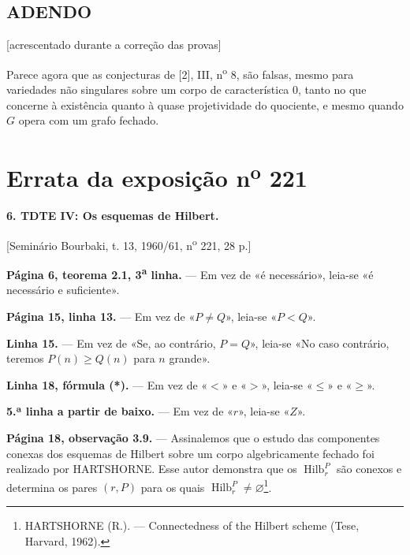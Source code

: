 \documentclass[11pt,twoside,openany]{book}
\numberwithin{equation}{section}
\newcommand{\src}[1]{%
  \phantomsection\hypertarget{src:#1}{}%
  \marginpar{\raggedleft\footnotesize\sffamily #1}%
}
\newcommand{\sid}[1]{\phantomsection\hypertarget{fga:#1}{}}
\theoremstyle{plain}
\theoremstyle{definition}
\theoremstyle{remark}
\newcommand{\FgaUnitKey}{frontmatter}
\renewcommand{\src}[1]{%
  \phantomsection\hypertarget{src:\FgaUnitKey:#1}{}%
  \marginpar{\raggedleft\footnotesize\sffamily #1}%
}
\begin{document}
\section*{ADENDO}
\begin{center}
{\small [acrescentado durante a correção das provas]}
\end{center}

Parece agora que as conjecturas de [2], III, n\textsuperscript{o} 8, são falsas,
mesmo para variedades não singulares sobre um corpo de característica 0, tanto
no que concerne à existência quanto à quase projetividade do quociente, e mesmo
quando $G$ opera com um grafo fechado.

\par

\def\FgaUnitKey{e221}\clearpage
\chapter*{Errata da exposição n\textsuperscript{o} 221}
\setcounter{footnote}{3}
\sid{e221}
\src{302}

\noindent\textbf{6. TDTE IV: Os esquemas de Hilbert.}

\begin{center}
[Seminário Bourbaki, t. 13, 1960/61, n\textsuperscript{o} 221, 28 p.]
\end{center}

\noindent\textbf{Página 6, teorema 2.1, 3\textsuperscript{a} linha.} --- Em vez de
«é necessário», leia-se «é necessário e suficiente».

\noindent\textbf{Página 15, linha 13.} --- Em vez de «$P\neq Q$», leia-se
«$P<Q$».

\noindent\textbf{Linha 15.} --- Em vez de «Se, ao contrário, $P=Q$», leia-se
«No caso contrário, teremos $P(n)\geq Q(n)$ para $n$ grande».

\noindent\textbf{Linha 18, fórmula (*).} --- Em vez de «$<$» e «$>$»,
leia-se «$\leq$» e «$\geq$».

\noindent\textbf{5.ª linha a partir de baixo.} --- Em vez de «$r$», leia-se
«$Z$».

\noindent\textbf{Página 18, observação 3.9.} --- Assinalemos que o estudo das
componentes conexas dos esquemas de Hilbert sobre um corpo algebricamente
fechado foi realizado por HARTSHORNE. Esse autor demonstra que os
$\operatorname{Hilb}^{P}_{r}$ são conexos e determina os pares $(r,P)$ para
os quais $\operatorname{Hilb}^{P}_{r}\neq\varnothing$\footnote{HARTSHORNE
(R.). --- Connectedness of the Hilbert scheme (Tese, Harvard, 1962).}.
\end{document}
